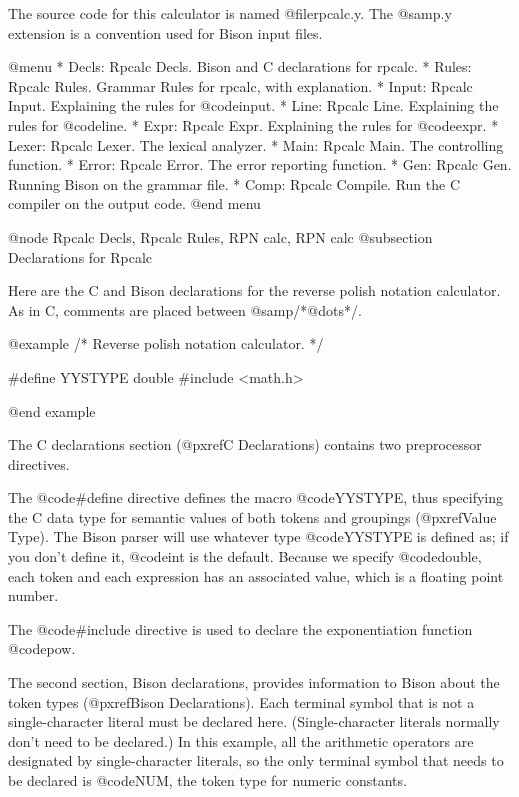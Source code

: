 {The source code for this calculator is named @file{rpcalc.y}.  The
@samp{.y} extension is a convention used for Bison input files.

@menu
* Decls: Rpcalc Decls.    Bison and C declarations for rpcalc.
* Rules: Rpcalc Rules.    Grammar Rules for rpcalc, with explanation.
* Input: Rpcalc Input.	  Explaining the rules for @code{input}.
* Line: Rpcalc Line.	  Explaining the rules for @code{line}.
* Expr: Rpcalc Expr.      Explaining the rules for @code{expr}.
* Lexer: Rpcalc Lexer.    The lexical analyzer.
* Main: Rpcalc Main.      The controlling function.
* Error: Rpcalc Error.    The error reporting function.
* Gen: Rpcalc Gen.        Running Bison on the grammar file.
* Comp: Rpcalc Compile.   Run the C compiler on the output code.
@end menu

@node Rpcalc Decls, Rpcalc Rules, RPN calc, RPN calc
@subsection Declarations for Rpcalc

Here are the C and Bison declarations for the reverse polish notation
calculator.  As in C, comments are placed between @samp{/*@dots{}*/}.

@example
/* Reverse polish notation calculator. */

#define YYSTYPE double
#include <math.h>


@end example

The C declarations section (@pxref{C Declarations}) contains two
preprocessor directives.

The @code{#define} directive defines the macro @code{YYSTYPE}, thus
specifying the C data type for semantic values of both tokens and groupings
(@pxref{Value Type}).  The Bison parser will use whatever type
@code{YYSTYPE} is defined as; if you don't define it, @code{int} is the
default.  Because we specify @code{double}, each token and each expression
has an associated value, which is a floating point number.

The @code{#include} directive is used to declare the exponentiation
function @code{pow}.

The second section, Bison declarations, provides information to Bison about
the token types (@pxref{Bison Declarations}).  Each terminal symbol that is
not a single-character literal must be declared here.  (Single-character
literals normally don't need to be declared.)  In this example, all the
arithmetic operators are designated by single-character literals, so the
only terminal symbol that needs to be declared is @code{NUM}, the token
type for numeric constants.

}
